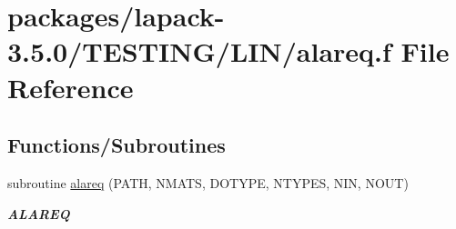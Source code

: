 \hypertarget{LIN_2alareq_8f}{}\section{packages/lapack-\/3.5.0/\+T\+E\+S\+T\+I\+N\+G/\+L\+I\+N/alareq.f File Reference}
\label{LIN_2alareq_8f}
\subsection*{Functions/\+Subroutines}
\begin{DoxyCompactItemize}
\item 
subroutine \hyperlink{group__aux__lin_ga0700b15ddc94106ea2d9fe4c97f8cdeb}{alareq} (P\+A\+T\+H, N\+M\+A\+T\+S, D\+O\+T\+Y\+P\+E, N\+T\+Y\+P\+E\+S, N\+I\+N, N\+O\+U\+T)
\begin{DoxyCompactList}\small\item\em {\bfseries A\+L\+A\+R\+E\+Q} \end{DoxyCompactList}\end{DoxyCompactItemize}
